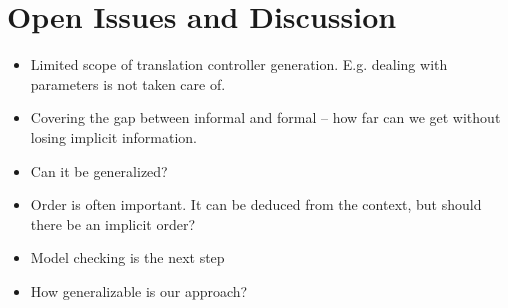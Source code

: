 \section{Open Issues and Discussion}

\begin{itemize}
  \item Limited scope of translation controller generation. E.g. dealing with
  parameters is not taken care of.
  \item Covering the gap between informal and formal -- how far can we get
  without losing implicit information.
  \item Can it be generalized?
  \item Order is often important. It can be deduced from the context, but should
  there be an implicit order?
  \item Model checking is the next step
  \item How generalizable is our approach?
\end{itemize}